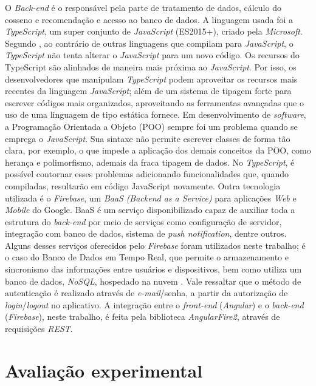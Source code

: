\documentclass[portuguese]{textolivre}
\begin{document}
 O \textit{Back-end} é o responsável pela parte de tratamento de dados, cálculo do cosseno e recomendação e acesso ao banco de dados. A linguagem usada foi a \textit{TypeScript}, um super conjunto de \textit{JavaScript} (ES2015+), criado pela \textit{Microsoft}. Segundo  \textcite{TypeScript:2018}, ao contrário de outras linguagens que compilam para \textit{JavaScript}, o \textit{TypeScript} não tenta alterar o \textit{JavaScript} para um novo código. Os recursos do TypeScript são alinhados de maneira mais próxima ao \textit{JavaScript}. Por isso, os desenvolvedores que manipulam \textit{TypeScript} podem aproveitar os recursos mais recentes da linguagem \textit{JavaScript}; além de um sistema de tipagem forte para escrever códigos mais organizados, aproveitando as ferramentas avançadas que o uso de uma linguagem de tipo estática fornece. Em desenvolvimento de \textit{software}, a Programação Orientada a Objeto (POO) sempre foi um problema quando se emprega o \textit{JavaScript}. Sua sintaxe não permite escrever classes de forma tão clara, por exemplo, o que impede a aplicação dos demais conceitos da POO, como herança e polimorfismo, ademais da fraca tipagem de dados. No \textit{TypeScript}, é possível contornar esses problemas adicionando funcionalidades que, quando compiladas, resultarão em código JavaScript novamente. 
 Outra tecnologia utilizada é o \textit{Firebase}, um \textit{BaaS} \textit{(Backend as a Service)} para aplicações \textit{Web} e \textit{Mobile} do Google. BaaS é um serviço disponibilizado capaz de auxiliar toda a estrutura do \textit{back-end} por meio de serviços como configuração de servidor, integração com banco de dados, sistema de \textit{push notification}, dentre outros. Alguns desses serviços oferecidos pelo \textit{Firebase} foram utilizados neste trabalho; é o caso do Banco de Dados em Tempo Real, que permite o armazenamento e sincronismo das informações entre usuários e dispositivos, bem como utiliza um banco de dados, \textit{NoSQL}, hospedado na nuvem \cite{RocketseatFirebase}. Vale ressaltar que o método de autenticação é realizado através de \textit{e-mail}/senha, a partir da autorização de \textit{login}/\textit{logout} no aplicativo. A integração entre o \textit{front-end} (\textit{Angular}) e o \textit{back-end} (\textit{Firebase}), neste trabalho, é feita pela biblioteca \textit{AngularFire2}, através de requisições \textit{REST}.

 \section{Avaliação experimental}
\label{cap:evaluation}
\end{document}
